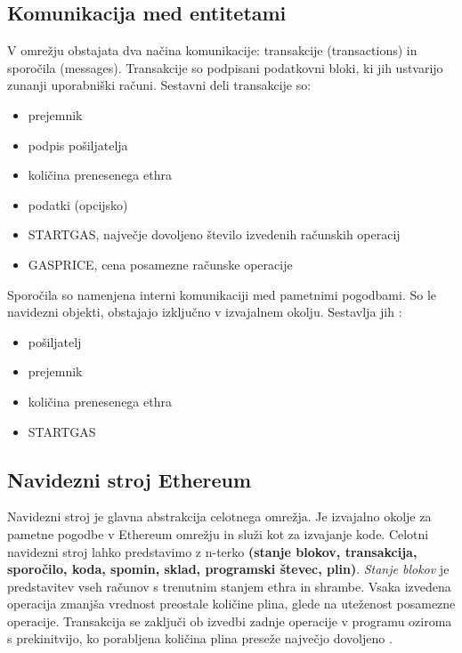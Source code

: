 \documentclass[a4paper, 12pt]{book}
\begin{document}
\subsection{Komunikacija med entitetami}
V omrežju obstajata dva načina komunikacije: transakcije (transactions) in sporočila (messages).
Transakcije so podpisani podatkovni bloki, ki jih ustvarijo zunanji uporabniški računi.
Sestavni deli transakcije so:
\begin{itemize}
	\item prejemnik
	\item podpis pošiljatelja
	\item količina prenesenega ethra
	\item podatki (opcijsko)
	\item STARTGAS, največje dovoljeno število izvedenih računskih operacij
	\item GASPRICE, cena posamezne računske operacije
\end{itemize}

Sporočila so namenjena interni komunikaciji med pametnimi pogodbami.
So le navidezni objekti, obstajajo izključno v izvajalnem okolju.
Sestavlja jih \cite{ethereumWhitepaper}:
\begin{itemize}
	\item pošiljatelj
	\item prejemnik
	\item količina prenesenega ethra
	\item STARTGAS
\end{itemize}


\subsection{Navidezni stroj Ethereum}

Navidezni stroj je glavna abstrakcija celotnega omrežja.
Je izvajalno okolje za pametne pogodbe v Ethereum omrežju in služi kot  za izvajanje kode.
Celotni navidezni stroj lahko predstavimo z n-terko \textbf{(stanje blokov, transakcija, sporočilo, koda, spomin, sklad, programski števec, plin)}.
\textit{Stanje blokov} je predstavitev vseh računov s trenutnim stanjem ethra in shrambe.
Vsaka izvedena operacija zmanjša vrednost preostale količine plina, glede na uteženost posamezne operacije.
Transakcija se zaključi ob izvedbi zadnje operacije v programu oziroma s prekinitvijo, ko porabljena količina plina preseže največjo dovoljeno \cite{ethereumWhitepaper}.
\end{document}
